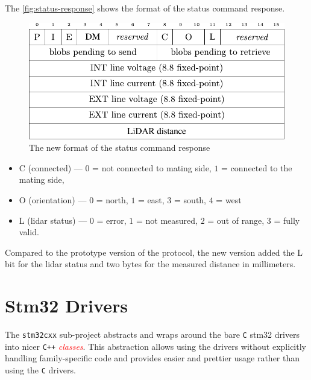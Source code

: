 \documentclass[
  digital,     %
  oneside,     %
  nosansbold,  %
  nocolorbold, %
  nolof,         %
  nolot,         %
]{fithesis4}
\newcommand{\TODO}[1]{\textcolor{red}{\textit{#1}}}
\newcommand{\TODOLIST}[1]{}
\begin{document}
{{{The \autoref{fig:status-response} shows the format of the status command response.

\begin{figure}
    \includegraphics[width=\textwidth,height=\textheight,keepaspectratio]{assets/status_response_new.pdf}
    \caption[Status command response]{The new format of the status command response}
    \label{fig:status-response}
\end{figure}

\begin{itemize}
    \item C (connected) --- $0$ = not connected to mating side, $1$ = connected to the mating side,
    \item O (orientation) --- $0$ = north, $1$ = east, $3$ = south, $4$ = west
    \item L (\acrshort{lidar} status) --- $0$ = error, $1$ = not measured, $2$ = out of range, $3$ = fully valid.
\end{itemize}

Compared to the prototype version of the protocol, the new version added the L bit for the \acrshort{lidar} status and two bytes for the measured distance in millimeters.

\section{ Stm32 Drivers }
\TODOLIST{
\begin{itemize}
    \item already implemented
    \item port files --- portability
    \item to implement --- \acrshort{i2c}
\end{itemize}
}

The \lstinline|stm32cxx| sub-project abstracts and wraps around the bare 
\verb|C| stm32 drivers into nicer \verb|C++| \TODO{classes}. This abstraction allows using the drivers without explicitly handling family-specific code and provides easier and prettier usage rather than using the \verb|C| drivers.

}}}
\end{document}
